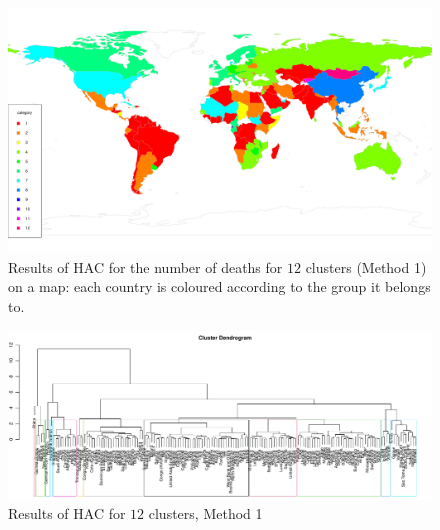 \documentclass[a4paper,12pt]{article}
\numberwithin{equation}{section}
\begin{document}
\begin{figure}[t!]
\begin{minipage}[t]{0.98\textwidth}
\includegraphics[width=\textwidth]{plots/deaths/map}
\caption{Results of HAC for the number of deaths for $12$ clusters (Method 1) on a map: each country is coloured according to the group it belongs to.}
\end{minipage}
\end{figure}


\newpage 
\FloatBarrier
\begin{figure}
\includegraphics[width=\textwidth]{plots/14days/dendrogram}
\caption{Results of HAC for $12$ clusters, Method 1}\label{fig:dend}
\end{figure}
\end{document}
